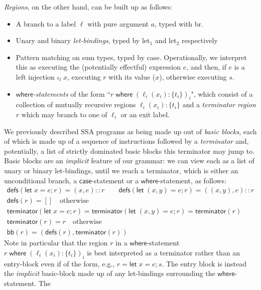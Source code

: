 \documentclass[acmsmall,screen,review]{acmart}
\newcommand{\ms}[1]{\ensuremath{\mathsf{#1}}}
\newcommand{\lto}{:}
\newcommand{\letstmt}[3]{\ensuremath{\ms{let}\;#1 = #2; #3}}
\newcommand{\where}[2]{#1\;\ms{where}\;#2}
\newcommand{\wbranch}[3]{#1(#2) \lto \{#3\}}
\newcommand{\brle}[1]{{\scriptsize\textsf{#1}}}
\begin{document}
\emph{Regions}, on the other hand, can be built up as follows:
\begin{itemize}
  \item A branch to a label $\ell$ with pure argument $a$, typed with \brle{br}.
  
  \item Unary and binary \emph{let-bindings}, typed by \brle{let$_1$} and \brle{let$_2$}
  respectively
  
  \item Pattern matching on sum types, typed by \brle{case}. Operationally, we interpret this as
  executing the (potentially effectful) expression $e$, and then, if $e$ is a left injection
  $\iota_l\;x$, executing $r$ with its value ($x$), otherwise executing $s$.
  
  \item \emph{\ms{where}-statements} of the form ``$\where{r}{(\wbranch{\ell_i}{x_i}{t_i})_i}$",
  which consist of a collection of mutually recursive regions $\wbranch{\ell_i}{x_i}{t_i}$ and a
  \emph{terminator region} $r$ which may branch to one of $\ell_i$ or an exit label.
\end{itemize}
We previously described SSA programs as being made up out of \emph{basic blocks}, each of which is
made up of a sequence of instructions followed by a \emph{terminator} and, potentially, a list of
strictly dominated basic blocks this terminator may jump to. Basic blocks are an \emph{implicit}
feature of our grammar: we can view each as a list of unary or binary let-bindings, until we reach a
terminator, which is either an unconditional branch, a \ms{case}-statement or a
\ms{where}-statement, as follows:
\begin{gather*}
  \ms{defs}(\letstmt{x}{e}{r}) = (x, e)::r \qquad 
  \ms{defs}(\letstmt{(x, y)}{e}{r}) = ((x, y), e)::r \\
  \ms{defs}(r) = [] \quad \text{otherwise} \\
  \ms{terminator}(\letstmt{x}{e}{r}) 
  = \ms{terminator}(\letstmt{(x, y)}{e}{r}) 
  = \ms{terminator}(r) \\
  \ms{terminator}(r) = r \quad \text{otherwise} \\
  \ms{bb}(r) = (\ms{defs}(r), \ms{terminator}(r))
\end{gather*}
Note in particular that the region $r$ in a \ms{where}-statement
$\where{r}{(\wbranch{\ell_i}{x_i}{t_i})_i}$ is best interpreted as a terminator rather than an
entry-block even if of the form, e.g., $r = \letstmt{x}{e}{s}$. The entry block is instead the
\emph{implicit} basic-block made up of any let-bindings surrounding the \ms{where}-statement. The
\end{document}
